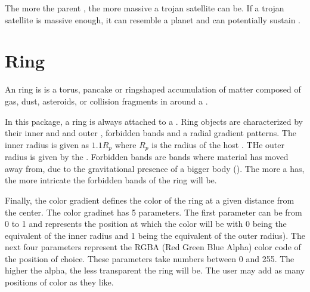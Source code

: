\documentclass[letterpaper,10pt,english]{sphinxmanual}
\begin{document}
\sphinxAtStartPar
The more {\hyperref[\detokenize{quantities/material/mass:id1}]{}} the parent {\hyperref[\detokenize{celestial_bodies/planet:id1}]{}},
the more massive a trojan satellite can be.
If a trojan satellite is massive enough, it can resemble a planet and can
potentially sustain {\hyperref[\detokenize{quantities/habitability/habitability:id1}]{}}.


\section{Ring}
\label{\detokenize{celestial_bodies/ring:ring}}\label{\detokenize{celestial_bodies/ring::doc}}\label{\detokenize{celestial_bodies/ring:id1}}
\sphinxAtStartPar
An ring is is a torus,
pancake or ring\sphinxhyphen{}shaped accumulation of matter composed of
gas, dust, asteroids, or collision fragments in {\hyperref[\detokenize{quantities/orbital/orbital:id1}]{}} around a {\hyperref[\detokenize{celestial_bodies/planet:id1}]{}}.

\sphinxAtStartPar
In this package, a ring is always attached to a {\hyperref[\detokenize{celestial_bodies/planet:id1}]{}}.
Ring objects are characterized by their inner and and outer {\hyperref[\detokenize{quantities/geometric/radius:id1}]{}},
forbidden bands and a radial gradient patterns.
The inner radius is given as \(1.1 R_p\) where \(R_p\) is the radius of the host
{\hyperref[\detokenize{celestial_bodies/planet:id1}]{}}.
THe outer radius is given by the {\hyperref[\detokenize{quantities/children_orbit_limits/dense_roche_limit:id1}]{}}.
Forbidden bands are bands where material has moved away from, due to the gravitational
presence of a bigger body ({\hyperref[\detokenize{celestial_bodies/satellite:id1}]{}}).
The more {\hyperref[\detokenize{celestial_bodies/satellite:id1}]{}} a {\hyperref[\detokenize{celestial_bodies/planet:id1}]{}} has, the more intricate the
forbidden bands of the ring will be.

\sphinxAtStartPar
Finally, the color gradient defines the color of the ring at a given distance from the center.
The color gradinet has 5 parameters. The first parameter can be from 0 to 1 and represents the position
at which the color will be \sphinxhyphen{} with 0 being the equivalent of the inner radius and 1 being the equivalent of
the outer radius). The next four parameters represent the RGBA (Red \sphinxhyphen{} Green \sphinxhyphen{} Blue \sphinxhyphen{} Alpha) color code
of the position of choice. These parameters take numbers between 0 and 255. The higher the alpha, the
less transparent the ring will be.
The user may add as many positions of color as they like.
\end{document}
